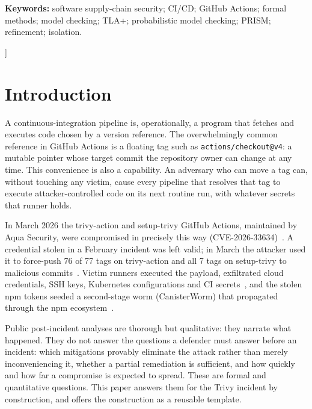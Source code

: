\documentclass[letterpaper,twocolumn,10pt]{article}
\newcommand{\code}[1]{\texttt{\small #1}}
\begin{document}
{\begin{minipage}{0.86\textwidth}
    \noindent\textbf{Keywords:} software supply-chain security; CI/CD; GitHub Actions; formal methods; model checking; TLA+; probabilistic model checking; PRISM; refinement; isolation.
  \end{minipage}
  \vspace{1.6em}
}]

\section{Introduction}
A continuous-integration pipeline is, operationally, a program that fetches and executes code chosen by a version reference. The overwhelmingly common reference in GitHub Actions is a floating tag such as \code{actions/checkout@v4}: a mutable pointer whose target commit the repository owner can change at any time. This convenience is also a capability. An adversary who can move a tag can, without touching any victim, cause every pipeline that resolves that tag to execute attacker-controlled code on its next routine run, with whatever secrets that runner holds.

In March 2026 the trivy-action and setup-trivy GitHub Actions, maintained by Aqua Security, were compromised in precisely this way (CVE-2026-33634)~\cite{aqua,cve}. A credential stolen in a February incident was left valid; in March the attacker used it to force-push 76 of 77 tags on trivy-action and all 7 tags on setup-trivy to malicious commits~\cite{msft}. Victim runners executed the payload, exfiltrated cloud credentials, SSH keys, Kubernetes configurations and CI secrets~\cite{wiz}, and the stolen npm tokens seeded a second-stage worm (CanisterWorm) that propagated through the npm ecosystem~\cite{unit42}.

Public post-incident analyses are thorough but qualitative: they narrate what happened. They do not answer the questions a defender must answer before an incident: which mitigations provably eliminate the attack rather than merely inconveniencing it, whether a partial remediation is sufficient, and how quickly and how far a compromise is expected to spread. These are formal and quantitative questions. This paper answers them for the Trivy incident by construction, and offers the construction as a reusable template.
\end{document}
